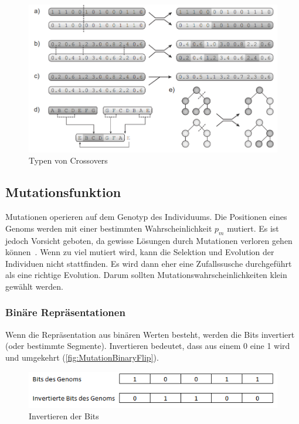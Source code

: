         \begin{figure}[H]
          \includegraphics[width=\textwidth,center]{graphics/crossover_types}
          \caption[\protect{}, S.27]{Typen von Crossovers\label{fig:crossTypes}}
        \end{figure}

    \subsection{Mutationsfunktion~\label{sub:mutFunction}}

      Mutationen operieren auf dem Genotyp des Individuums.
      Die Positionen eines Genoms werden mit einer bestimmten Wahrscheinlichkeit \(p_{m}\) mutiert.
      Es ist jedoch Vorsicht geboten, da gewisse Lösungen durch Mutationen verloren gehen können~\cite{Sampson1976}.
      Wenn zu viel mutiert wird, kann die Selektion und Evolution der Individuen nicht stattfinden.
      Es wird dann eher eine Zufallssusche durchgeführt als eine richtige Evolution.
      Darum sollten Mutationswahrscheinlichkeiten klein gewählt werden.

      \subsubsection{Binäre Repräsentationen}

        Wenn die Repräsentation aus binären Werten besteht, werden die Bits invertiert (oder bestimmte Segmente).
        Invertieren bedeutet, dass aus einem 0 eine 1 wird und umgekehrt (\vref{fig:MutationBinaryFlip}).

        \begin{figure}[H]
          \includegraphics[scale=1,center]{graphics/mutation_binary_flip}
          \caption{Invertieren der Bits\label{fig:MutationBinaryFlip}}
        \end{figure}

